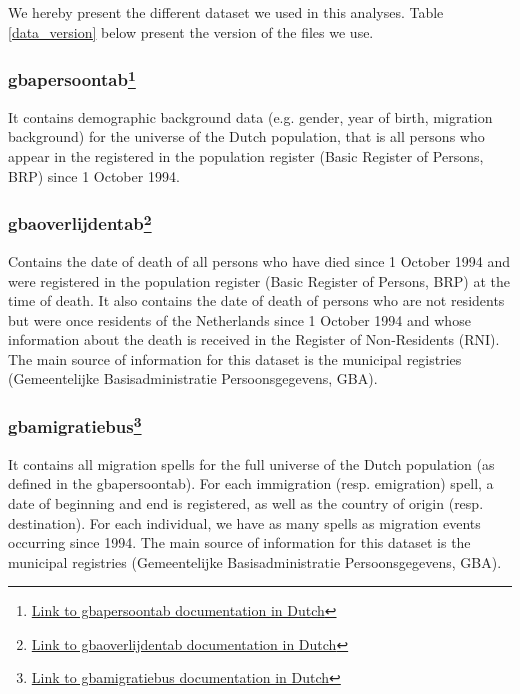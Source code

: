 \documentclass[12pt,a4paper]{article}
\begin{document}
We hereby present the different dataset we used in this analyses. Table \ref{data_version} below present the version of the files we use. 


\subsubsection*{gbapersoontab\footnote{\hyperlink{ https://www.cbs.nl/nl-nl/onze-diensten/maatwerk-en-microdata/microdata-zelf-onderzoek-doen/microdatabestanden/gbapersoontab-persoonskenmerken-van-personen-in-de-brp}{Link to gbapersoontab documentation in Dutch}}}

It contains demographic background data (e.g. gender, year of birth, migration background) for the universe of the Dutch population, that is  all persons who appear in the registered in the population register (Basic Register of Persons, BRP) since 1 October 1994. 

\subsubsection*{gbaoverlijdentab\footnote{\hyperlink{ https://www.cbs.nl/nl-nl/onze-diensten/maatwerk-en-microdata/microdata-zelf-onderzoek-doen/microdatabestanden/gbaoverlijdentab-datum-van-overlijden-van-personen-die-ingeschreven-staan-in-de-gba}{Link to gbaoverlijdentab documentation in Dutch}}}

Contains the date of death of all persons who have died since 1 October 1994 and were registered in the population register (Basic Register of Persons, BRP) at the time of death. It also contains the date of death of persons who are not residents but were once residents of the Netherlands since 1 October 1994 and whose information about the death is received in the Register of Non-Residents (RNI). The main source of information for this dataset is the municipal registries (Gemeentelijke Basisadministratie Persoonsgegevens, GBA).


\subsubsection*{gbamigratiebus\footnote{\hyperlink{ https://www.cbs.nl/nl-nl/onze-diensten/maatwerk-en-microdata/microdata-zelf-onderzoek-doen/microdatabestanden/gbamigratiebus-migratiekenmerken-van-personen}{Link to gbamigratiebus documentation in Dutch}}}

It contains all migration spells for the full universe of the Dutch population (as defined in the gbapersoontab). For each immigration (resp. emigration) spell, a date of beginning and end is registered, as well as the country of origin (resp. destination). For each individual, we have as many spells as migration events occurring since 1994. The main source of information for this dataset is the municipal registries (Gemeentelijke Basisadministratie Persoonsgegevens, GBA).
\end{document}
